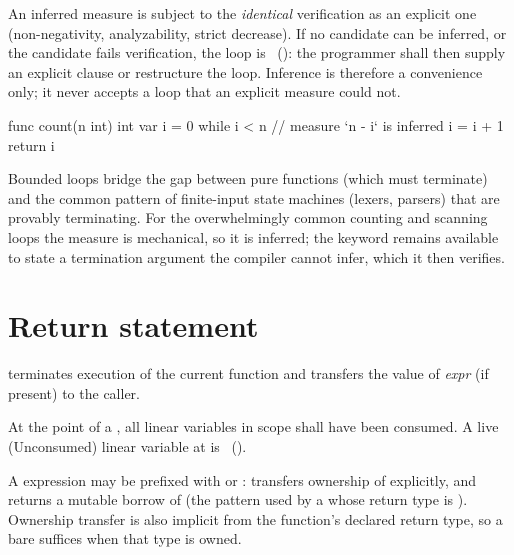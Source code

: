 \pnum
An inferred measure is subject to the \emph{identical} verification as an
explicit one (non-negativity, analyzability, strict decrease).  If no
candidate can be inferred, or the candidate fails verification, the loop is
\illformed{}~(): the programmer shall then supply an explicit
 clause or restructure the loop.  Inference is therefore a
convenience only; it never accepts a loop that an explicit measure could not.

\begin{example}
\begin{laincode}
func count(n int) int {
    var i = 0
    while i < n {          // measure `n - i` is inferred
        i = i + 1
    }
    return i
}
\end{laincode}
\end{example}

\begin{rationale}
  Bounded loops bridge the gap between pure functions (which must terminate)
  and the common pattern of finite-input state machines (lexers, parsers)
  that are provably terminating.  For the overwhelmingly common counting and
  scanning loops the measure is mechanical, so it is inferred; the
   keyword remains available to state a termination argument
  the compiler cannot infer, which it then verifies.
\end{rationale}

\section{Return statement}
\label{sec:stmt.return}

\pnum
{} terminates execution of the current function
and transfers the value of \textit{expr} (if present) to the
caller.

\begin{constraint}
  At the point of a , all linear variables in scope shall
  have been consumed.  A live (Unconsumed) linear variable at 
  is \illformed{}~().
\end{constraint}

\pnum
A  expression may be prefixed with  or :
 transfers ownership of  explicitly, and
 returns a mutable borrow of  (the pattern used by
a  whose return type is ).  Ownership transfer is also
implicit from the function's declared return type, so a bare 
suffices when that type is owned.


